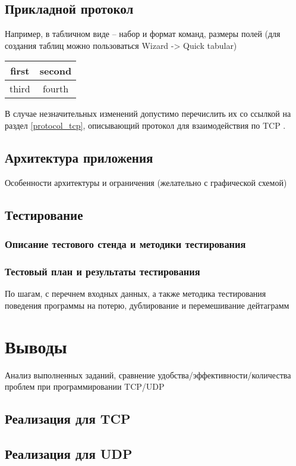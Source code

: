 \documentclass[12pt,a4paper]{report}
\begin{document}
\section{Прикладной протокол}

Например, в табличном виде -- набор и формат команд, размеры полей
(для создания таблиц можно пользоваться Wizard -> Quick tabular)


\begin{tabular}{|c|c|}
\hline 
first & second \\ 
\hline 
third & fourth \\ 
\hline 
\end{tabular} 


В случае незначительных изменений допустимо перечислить их со ссылкой на раздел \ref{protocol_tcp}, описывающий протокол для взаимодействия по TCP .

\section{Архитектура приложения}
Особенности архитектуры и ограничения (желательно с графической схемой) 

\section{Тестирование}
\subsection{Описание тестового стенда и методики тестирования}
\subsection{Тестовый план и результаты тестирования}
По шагам, с перечнем входных данных,
а также  методика тестирования поведения программы на потерю, дублирование и перемешивание дейтаграмм

\chapter{Выводы}
Анализ выполненных заданий, сравнение удобства/эффективности/количества проблем при программировании TCP/UDP
\section{Реализация для TCP}
\section{Реализация для UDP}
\end{document}
